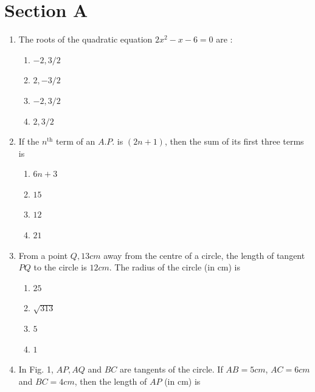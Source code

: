 \documentclass[journal,12pt,twocolumn]{IEEEtran}
\renewcommand\thesection{\arabic{section}}
\begin{document}
\section{Section A}
\renewcommand{\theequation}{\theenumi}
\begin{enumerate}[label=\thesection.\arabic*.,ref=\thesection.\theenumi]
\item The roots of the  quadratic equation $2x^2-x-6=0$ are :
 \begin{enumerate}
    \item $-2,3/2$\\
    \item $2, -3/2$\\
    \item $-2, 3/2$\\
    \item $2, 3/2$\\
 \end{enumerate} 
\item If the  $n^{\text{th}}$ term of an $A.P.$ is $(2n+ 1)$, then the sum of its first three terms is
 \begin{enumerate}
    \item $6n + 3$\\
    \item $15$ \\
    \item $12$\\
    \item $21$ \\
 \end{enumerate}
\item From a point $Q, 13 cm$ away from the centre of a circle, the length of tangent $PQ$ to the circle is $12 cm$. The radius of the circle (in cm)
is \\
 \begin{enumerate}
    \item $25$\\
    \item $\sqrt{313}$\\
    \item $5$\\
    \item $1$ \\
 \end{enumerate}
\item In Fig. 1, $AP, AQ$ and $BC$ are tangents of the circle. If $AB=5cm$, $AC=6cm$ and $BC=4 cm$, then the length of $AP$ (in cm) is \\

\end{enumerate}
\end{document}
